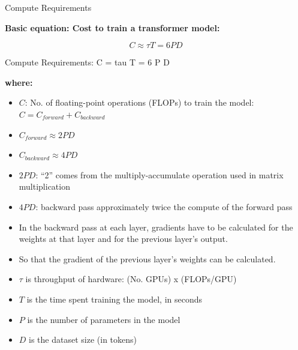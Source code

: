 
\begin{vbframe}{Compute Requirements}

\vfill

\textbf{Basic equation: Cost to train a transformer model:}

\vspace{1.5cm}

$$C \approx \tau T = 6 P D$$ 

\vspace{1.5cm}

\centering {}

\vfill

\end{vbframe}


\begin{vbframe}{Compute Requirements: C = tau T = 6 P D}


\vfill

\textbf{where:}

\begin{itemize}
    \item $C$: No. of floating-point operations (FLOPs) to train the model:\\
          $C = C_{forward} + C_{backward}$
	\item $C_{forward} \approx 2 P D$
	\item $C_{backward} \approx 4 P D$
\item $2PD$: ``2'' comes from the multiply-accumulate
          operation used in
          matrix multiplication
          \item $4PD$: backward pass approximately twice
          the compute of the forward pass
\item           In the backward pass at each
          layer, gradients have to be calculated for the
          weights at that layer and for the previous layer's
          output.
          \item So that the gradient of the previous
          layer's weights can be calculated. 
	\item $\tau$ is throughput of hardware: (No. GPUs) x (FLOPs/GPU)
	\item $T$ is the time spent training the model, in seconds
	\item $P$ is the number of parameters in the model
	\item $D$ is the dataset size (in tokens)
\end{itemize}

\vfill

\end{vbframe}

